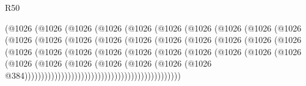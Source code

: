 \begin{lexlean}{R50}
\begin{coremodule}
                        (@1026
                          (@1026
                            (@1026
                              (@1026
                                (@1026
                                  (@1026
                                    (@1026
                                      (@1026
                                        (@1026
                                          (@1026
                                            (@1026
                                              (@1026
                                                (@1026
                                                  (@1026
                                                    (@1026
                                                      (@1026
                                                        (@1026
                                                          (@1026
                                                            (@1026
                                                              (@1026
                                                                (@1026
                                                                  (@1026
                                                                    (@1026
                                                                      (@1026
                                                                        (@1026
                                                                          (@1026
                                                                            (@1026
                                                                              (@1026
                                                                                (@1026
                                                                                  (@1026
                                                                                    (@1026
                                                                                      (@1026
                                                                                        (@1026
                                                                                          (@1026
                                                                                            (@1026
                                                                                              (@1026
                                                                                                (@1026
                                                                                                  @384)))))))))))))))))))))))))))))))))))))))))))))))

\end{coremodule}
\end{lexlean}
